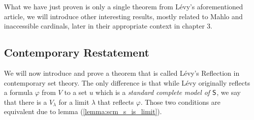 What we have just proven is only a single theorem from Lévy's aforementioned article, we will introduce other interesting results, mostly related to Mahlo and inaccessible cardinals, later in their appropriate context in chapter 3. %


\subsection{Contemporary Restatement}
We will now introduce and prove a theorem that is called Lévy's Reflection in contemporary set theory. The only difference is that while Lévy originally reflects a formula $\varphi$ from $V$ to a set $u$ which is a \emph{standard complete model of $\sf{S}$}, we say that there is a $V_\lambda$ for a limit $\lambda$ that reflects $\varphi$. Those two conditions are equivalent due to lemma (\ref{lemma:scm_s_is_limit}).




